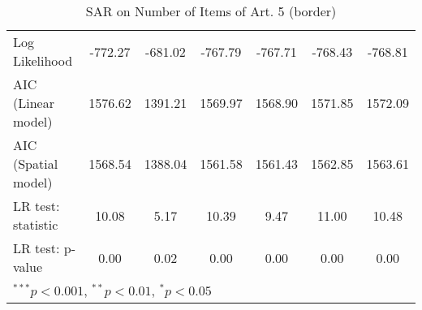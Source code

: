 \begin{table}[!h]
\begin{center}
\begin{tabular}{l c c c c c c }
Log Likelihood          & -772.27     & -681.02     & -767.79     & -767.71     & -768.43     & -768.81     \\
AIC (Linear model)      & 1576.62     & 1391.21     & 1569.97     & 1568.90     & 1571.85     & 1572.09     \\
AIC (Spatial model)     & 1568.54     & 1388.04     & 1561.58     & 1561.43     & 1562.85     & 1563.61     \\
LR test: statistic      & 10.08       & 5.17        & 10.39       & 9.47        & 11.00       & 10.48       \\
LR test: p-value        & 0.00        & 0.02        & 0.00        & 0.00        & 0.00        & 0.00        \\
\bottomrule
\multicolumn{7}{l}{\scriptsize{$^{***}p<0.001$, $^{**}p<0.01$, $^*p<0.05$}}
\end{tabular}
\caption{SAR on Number of Items of Art. 5 (border)}
\label{table:coefficients}
\end{center}
\end{table}
